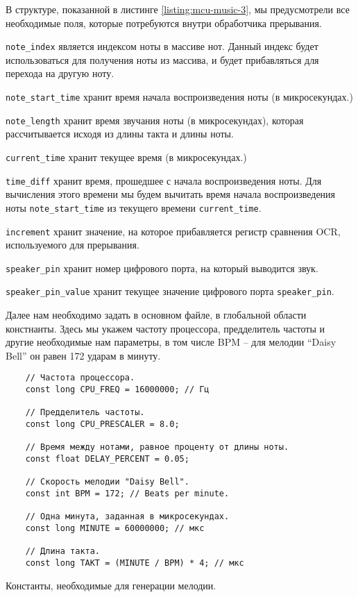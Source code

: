 \documentclass[../sparc.tex]{subfiles}
\begin{document}
В структуре, показанной в листинге \ref{listing:mcu-music-3}, мы предусмотрели
все необходимые поля, которые потребуются внутри обработчика прерывания.

\texttt{note_index} является индексом ноты в массиве нот.  Данный
индекс будет использоваться для получения ноты из массива, и будет прибавляться
для перехода на другую ноту.

\texttt{note_start_time} хранит время начала воспроизведения ноты (в
микросекундах.)

\texttt{note_length} хранит время звучания ноты (в микросекундах),
которая рассчитывается исходя из длины такта и длины ноты.

\texttt{current_time} хранит текущее время (в микросекундах.)

\texttt{time_diff} хранит время, прошедшее с начала воспроизведения
ноты.  Для вычисления этого времени мы будем вычитать время начала
воспроизведения ноты \texttt{note_start_time} из текущего времени
\texttt{current_time}.

\texttt{increment} хранит значение, на которое прибавляется регистр
сравнения OCR, используемого для прерывания.

\texttt{speaker_pin} хранит номер цифрового порта, на который выводится
звук.

\texttt{speaker_pin_value} хранит текущее значение цифрового порта
\texttt{speaker_pin}.

Далее нам необходимо задать в основном файле, в глобальной области констнанты.
Здесь мы укажем частоту процессора, предделитель частоты и другие необходимые
нам параметры, в том числе \gls{BPM} -- для мелодии ``Daisy Bell'' он равен 172
ударам в минуту.

\begin{listing}[H]
  \begin{verbatim}
    // Частота процессора.
    const long CPU_FREQ = 16000000; // Гц

    // Предделитель частоты.
    const long CPU_PRESCALER = 8.0;

    // Время между нотами, равное проценту от длины ноты.
    const float DELAY_PERCENT = 0.05;

    // Скорость мелодии "Daisy Bell".
    const int BPM = 172; // Beats per minute.

    // Одна минута, заданная в микросекундах.
    const long MINUTE = 60000000; // мкс

    // Длина такта.
    const long TAKT = (MINUTE / BPM) * 4; // мкс
  \end{verbatim}
  \caption{Константы, необходимые для генерации мелодии.}
  \label{listing:mcu-music-4}
\end{listing}
\end{document}
